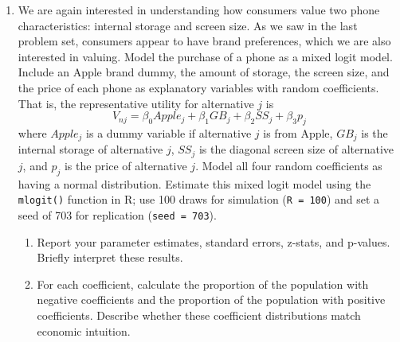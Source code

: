 \documentclass[11pt,letterpaper]{article}
\begin{document}
\begin{enumerate}[label=\alph*., leftmargin=*]
	\item We are again interested in understanding how consumers value two phone characteristics: internal storage and screen size. As we saw in the last problem set, consumers appear to have brand preferences, which we are also interested in valuing. Model the purchase of a phone as a mixed logit model. Include an Apple brand dummy, the amount of storage, the screen size, and the price of each phone as explanatory variables with random coefficients. That is, the representative utility for alternative $j$ is
	$$V_{nj} = \beta_0 Apple_j + \beta_1 GB_j + \beta_2 SS_j + \beta_3 p_j$$
	where $Apple_j$ is a dummy variable if alternative $j$ is from Apple, $GB_j$ is the internal storage of alternative $j$, $SS_j$ is the diagonal screen size of alternative $j$, and $p_j$ is the price of alternative $j$. Model all four random coefficients as having a normal distribution. Estimate this mixed logit model using the \texttt{mlogit()} function in R; use 100 draws for simulation (\texttt{R = 100}) and set a seed of 703 for replication (\texttt{seed = 703}).
	\begin{enumerate}[label=\roman*.]
		\item Report your parameter estimates, standard errors, z-stats, and p-values. Briefly interpret these results. 
		\item For each coefficient, calculate the proportion of the population with negative coefficients and the proportion of the population with positive coefficients. Describe whether these coefficient distributions match economic intuition.
	\end{enumerate}


\end{enumerate}
\end{document}
